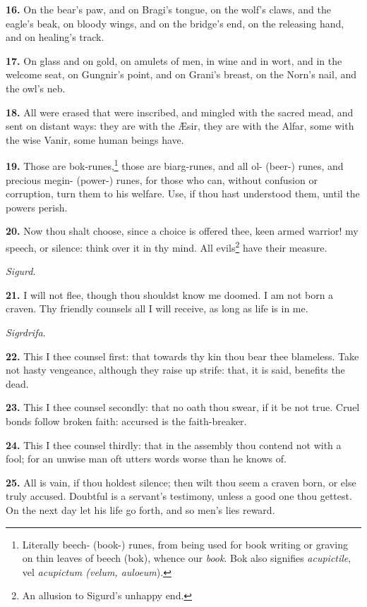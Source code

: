 \textbf{16.} On the bear's paw, and on Bragi's tongue, on the wolf's claws,
and the eagle's beak, on bloody wings, and on the bridge's end, on the
releasing hand, and on healing's track.

\textbf{17.} On glass and on gold, on amulets of men, in wine and in wort,
and in the welcome seat, on Gungnir's point, and on Grani's breast, on
the Norn's nail, and the owl's neb.

\textbf{18.} All were erased that were inscribed, and mingled with the sacred
mead, and sent on distant ways: they are with the Æsir, they are with
the Alfar, some with the wise Vanir, some human beings have.

\textbf{19.} Those are bok-runes,\footnote{Literally beech- (book-) runes, from being used for book
writing or graving on thin leaves of beech (bok), whence our \emph{book}.
Bok also signifies \emph{acupictile}, vel \emph{acupictum (velum, auloeum}).} those are biarg-runes, and all
ol- (beer-) runes, and precious megin- (power-) runes, for those who
can, without confusion or corruption, turn them to his welfare. Use,
if thou hast understood them, until the powers perish.

\textbf{20.} Now thou shalt choose, since a choice is offered thee, keen
armed warrior! my speech, or silence: think over it in thy mind. All
evils\footnote{An allusion to Sigurd's unhappy end.} have their measure.

\emph{Sigurd}.

\textbf{21.} I will not flee, though thou shouldst know me doomed. I am not
born a craven. Thy friendly counsels all I will receive, as long as
life is in me.

\emph{Sigrdrifa}.

\textbf{22.} This I thee counsel first: that towards thy kin thou bear thee
blameless. Take not hasty vengeance, although they raise up strife:
that, it is said, benefits the dead.

\textbf{23.} This I thee counsel secondly: that no oath thou swear, if it be
not true. Cruel bonds follow broken faith: accursed is the
faith-breaker.

\textbf{24.} This I thee counsel thirdly: that in the assembly thou contend
not with a fool; for an unwise man oft utters words worse than he
knows of.

\textbf{25.} All is vain, if thou holdest silence; then wilt thou seem a
craven born, or else truly accused. Doubtful is a servant's testimony,
unless a good one thou gettest. On the next day let his life go forth,
and so men's lies reward.

